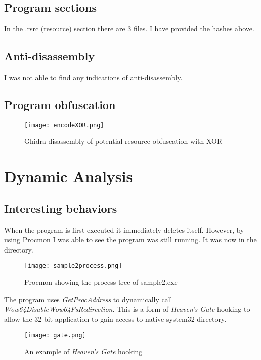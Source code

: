 \documentclass{article}
\begin{document}
    \subsection{Program sections}
    In the .rsrc (resource) section there are 3 files. I have provided the hashes above.

    \subsection{Anti-disassembly}
    I was not able to find any indications of anti-disassembly.
    \subsection{Program obfuscation}
    \begin{figure}[H]
        \texttt{[image: encodeXOR.png]}
        \caption{Ghidra disassembly of potential resource obfuscation with XOR}
    \end{figure}

    \section{Dynamic Analysis}

    \subsection{Interesting behaviors}
    When the program is first executed it immediately deletes itself. However, by using Procmon I was able to see the program was still running. It was now in the  directory.
    \begin{figure}[H]
        \texttt{[image: sample2process.png]}
        \caption{Procmon showing the process tree of sample2.exe}
    \end{figure}
    The program uses \textit{GetProcAddress} to dynamically call \textit{Wow64DisableWow64FsRedirection}. This is a form of \textit{Heaven's Gate} hooking to allow the 32-bit application to gain access to native system32 directory\cite{gate}.
    \begin{figure}[H]
        \texttt{[image: gate.png]}
        \caption{An example of \textit{Heaven's Gate} hooking}
    \end{figure}
\end{document}
